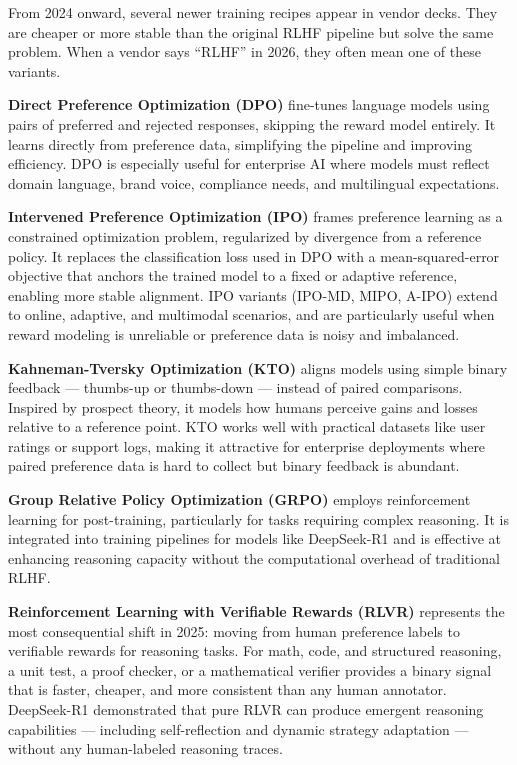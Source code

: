 From 2024 onward, several newer training recipes appear in vendor decks. They are cheaper or more stable than the original RLHF pipeline but solve the same problem. When a vendor says ``RLHF'' in 2026, they often mean one of these variants.

\textbf{Direct Preference Optimization (DPO)} fine-tunes language models using pairs of preferred and rejected responses, skipping the reward model entirely. It learns directly from preference data, simplifying the pipeline and improving efficiency. DPO is especially useful for enterprise AI where models must reflect domain language, brand voice, compliance needs, and multilingual expectations.

\textbf{Intervened Preference Optimization (IPO)} frames preference learning as a constrained optimization problem, regularized by divergence from a reference policy. It replaces the classification loss used in DPO with a mean-squared-error objective that anchors the trained model to a fixed or adaptive reference, enabling more stable alignment. IPO variants (IPO-MD, MIPO, A-IPO) extend to online, adaptive, and multimodal scenarios, and are particularly useful when reward modeling is unreliable or preference data is noisy and imbalanced.

\textbf{Kahneman-Tversky Optimization (KTO)} aligns models using simple binary feedback --- thumbs-up or thumbs-down --- instead of paired comparisons. Inspired by prospect theory, it models how humans perceive gains and losses relative to a reference point. KTO works well with practical datasets like user ratings or support logs, making it attractive for enterprise deployments where paired preference data is hard to collect but binary feedback is abundant.

\textbf{Group Relative Policy Optimization (GRPO)} employs reinforcement learning for post-training, particularly for tasks requiring complex reasoning. It is integrated into training pipelines for models like DeepSeek-R1 and is effective at enhancing reasoning capacity without the computational overhead of traditional RLHF.

\textbf{Reinforcement Learning with Verifiable Rewards (RLVR)} represents the most consequential shift in 2025: moving from human preference labels to verifiable rewards for reasoning tasks. For math, code, and structured reasoning, a unit test, a proof checker, or a mathematical verifier provides a binary signal that is faster, cheaper, and more consistent than any human annotator. DeepSeek-R1 demonstrated that pure RLVR can produce emergent reasoning capabilities --- including self-reflection and dynamic strategy adaptation --- without any human-labeled reasoning traces.


